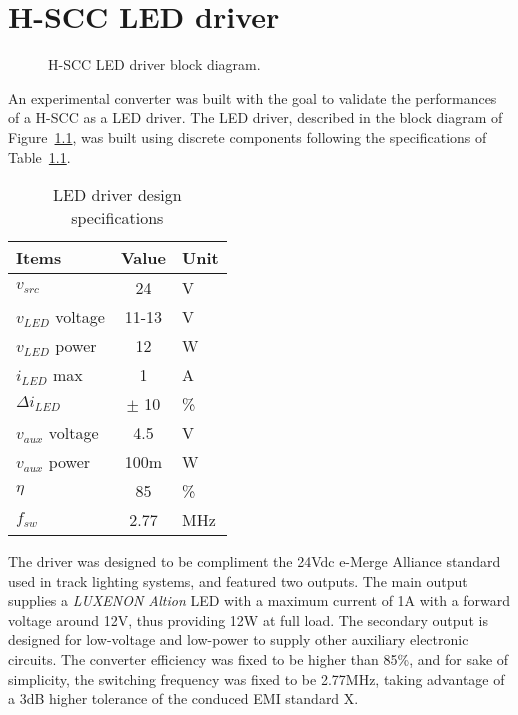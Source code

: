 \chapter{H-SCC LED driver}
\label{ch:hscc_led_driver}

\begin{figure}[!h]
\centering

\caption[H-SCC LED driver block diagram]{H-SCC LED driver block diagram.}
\label{fig:bd_emerge_drv}
\end{figure}


An experimental converter was built with the goal to validate the performances of a H-SCC as a LED driver. The LED driver, described in the block diagram of Figure~\ref{fig:bd_emerge_drv}, was built using discrete components following the specifications of Table~\ref{tab:dsg_param_drv}.

\begin{table}[!h]
 \caption{LED driver design specifications}\label{tab:dsg_param_drv}
 \centering
 \renewcommand{\arraystretch}{1.2}
 \begin{tabular}{l | cl}
  Items & Value & Unit \\
  \midrule
  $v_{src}$ & 24 & V \\
  \hline
  $v_{LED}$ voltage & 11-13 & V \\
  $v_{LED}$ power & 12 & W \\
  $i_{LED}$ max & 1 & A \\
  $\Delta i_{LED}$ & $\pm$ 10 & \% \\
  \hline
  $v_{aux}$ voltage & 4.5 & V \\
  $v_{aux}$ power & 100m & W \\
  \hline
  $\eta$  & 85 & \% \\
  $f_{sw}$ & 2.77 & MHz\\
\end{tabular}
\end{table}

The driver was designed to be compliment the 24Vdc e-Merge Alliance standard used in track lighting systems, and featured two outputs. The main output supplies a \emph{LUXENON Altion} LED with a maximum current of 1A with a forward voltage around 12V, thus providing 12W at full load. The secondary output is designed for low-voltage and low-power to supply other auxiliary electronic circuits. The converter efficiency was fixed to be higher than 85\%, and for sake of simplicity, the switching frequency was fixed to be 2.77MHz, taking advantage of a 3dB higher tolerance of the conduced EMI standard X.

